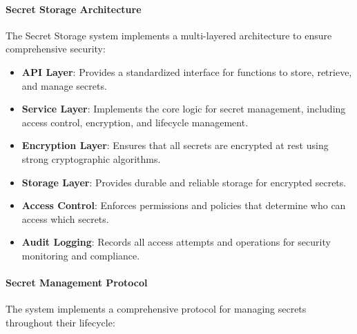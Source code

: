 \documentclass{article}
\begin{document}
\paragraph{Secret Storage Architecture}
The Secret Storage system implements a multi-layered architecture to ensure comprehensive security:

\begin{itemize}
    \item \textbf{API Layer}: Provides a standardized interface for functions to store, retrieve, and manage secrets.
    
    \item \textbf{Service Layer}: Implements the core logic for secret management, including access control, encryption, and lifecycle management.
    
    \item \textbf{Encryption Layer}: Ensures that all secrets are encrypted at rest using strong cryptographic algorithms.
    
    \item \textbf{Storage Layer}: Provides durable and reliable storage for encrypted secrets.
    
    \item \textbf{Access Control}: Enforces permissions and policies that determine who can access which secrets.
    
    \item \textbf{Audit Logging}: Records all access attempts and operations for security monitoring and compliance.
\end{itemize}

\paragraph{Secret Management Protocol}
The system implements a comprehensive protocol for managing secrets throughout their lifecycle:
\end{document}
